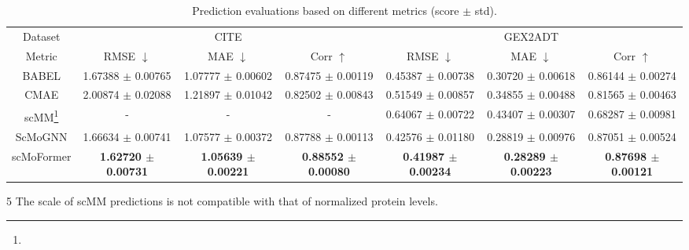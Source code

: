 \begin{table*}[t] 
\small
\caption{Prediction evaluations based on different metrics (score $\pm$ std).}
\vspace{-1em}
\label{table:main}
\begin{threeparttable}
\begin{tabular}{c|ccc|ccc}
    \toprule
    Dataset      & \multicolumn{3}{|c|}{CITE}  & \multicolumn{3}{|c}{GEX2ADT}\\
    Metric       & RMSE $\downarrow$                 & MAE $\downarrow$                   & Corr   $\uparrow$               & RMSE $\downarrow$                 & MAE $\downarrow$                  & Corr  $\uparrow$                \\ 
    \midrule 
    BABEL        & 1.67388 $\pm$ 0.00765 & 1.07777 $\pm$ 0.00602 & 0.87475 $\pm$ 0.00119 & 0.45387 $\pm$ 0.00738 & 0.30720 $\pm$ 0.00618 & 0.86144 $\pm$ 0.00274 \\
    CMAE         & 2.00874 $\pm$ 0.02088 & 1.21897 $\pm$ 0.01042 & 0.82502 $\pm$ 0.00843 & 0.51549 $\pm$ 0.00857 & 0.34855 $\pm$ 0.00488 & 0.81565 $\pm$ 0.00463\\
    scMM\footnote{}         & -                     & -                     & -                     & 0.64067 $\pm$ 0.00722 & 0.43407 $\pm$ 0.00307 & 0.68287 $\pm$ 0.00981\\
    ScMoGNN      & 1.66634 $\pm$ 0.00741 & 1.07577 $\pm$ 0.00372 & 0.87788 $\pm$ 0.00113 & 0.42576 $\pm$ 0.01180 & 0.28819 $\pm$ 0.00976 & 0.87051 $\pm$ 0.00524\\
    scMoFormer & \textbf{1.62720 $\pm$ 0.00731} & \textbf{1.05639 $\pm$ 0.00221} & \textbf{0.88552 $\pm$ 0.00080} & \textbf{0.41987 $\pm$ 0.00234} & \textbf{0.28289 $\pm$ 0.00223} & \textbf{0.87698 $\pm$ 0.00121}\\
    \bottomrule
\end{tabular}
\begin{tablenotes}
   \item[5] The scale of scMM predictions is not compatible with that of normalized protein levels.
  \end{tablenotes}
\end{threeparttable}
\vspace{-1em}
\end{table*}